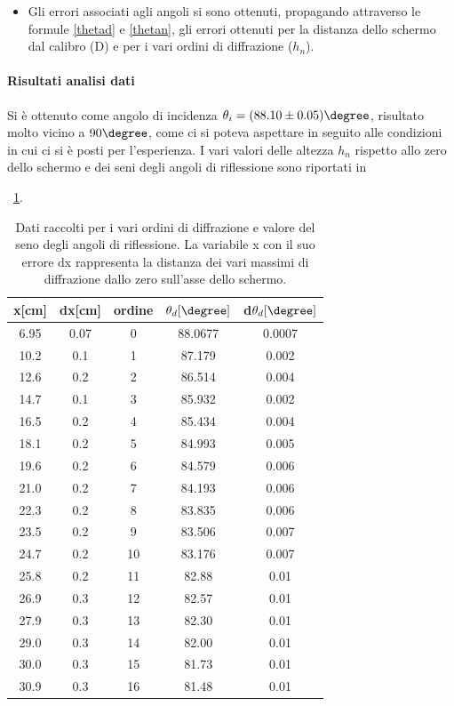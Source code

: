 \documentclass[a4paper,10pt]{article}
\begin{document}
{{\begin{itemize}
\item Gli errori associati agli angoli si sono ottenuti, propagando attraverso le formule \eqref{thetad} e \eqref{thetan}, gli errori ottenuti per    la distanza dello schermo dal calibro (D) e per i vari ordini di diffrazione ($h_n$).
\end{itemize}

\paragraph{Risultati analisi dati}
Si è ottenuto come angolo di incidenza $\theta_i = (88.10 \pm 0.05)\degree$, risultato molto vicino a $90\degree$, come ci si poteva aspettare in seguito alle condizioni in cui ci si è posti per l'esperienza. I vari valori delle altezza $h_n$ rispetto allo zero dello schermo e dei seni degli angoli di riflessione sono riportati in \tablename{~\ref{tab:data}.

\begin{table}[H]
	\centering
	\begin{tabular}{c|c|c|c|c}
x[cm] & dx[cm] & ordine & $\theta_d[\degree]$ & d$\theta_d[\degree]$ \\
\hline
6.95 & 0.07 & 0 & 88.0677 & 0.0007 \\
10.2 & 0.1 & 1 & 87.179 & 0.002 \\
12.6 & 0.2 & 2 & 86.514 & 0.004 \\
14.7 & 0.1 & 3 & 85.932 & 0.002 \\
16.5 & 0.2 & 4 & 85.434 & 0.004 \\
18.1 & 0.2 & 5 & 84.993 & 0.005 \\
19.6 & 0.2 & 6 & 84.579 & 0.006 \\
21.0 & 0.2 & 7 & 84.193 & 0.006 \\
22.3 & 0.2 & 8 & 83.835 & 0.006 \\
23.5 & 0.2 & 9 & 83.506 & 0.007 \\
24.7 & 0.2 & 10 & 83.176 & 0.007 \\
25.8 & 0.2 & 11 & 82.88 & 0.01 \\
26.9 & 0.3 & 12 & 82.57 & 0.01 \\
27.9 & 0.3 & 13 & 82.30 & 0.01 \\
29.0 & 0.3 & 14 & 82.00 & 0.01 \\
30.0 & 0.3 & 15 & 81.73 & 0.01 \\
30.9 & 0.3 & 16 & 81.48 & 0.01 \\
	\end{tabular}
\caption{Dati raccolti per i vari ordini di diffrazione e valore del seno degli angoli di riflessione. La variabile x con il suo errore dx rappresenta la distanza dei vari massimi di diffrazione dallo zero sull'asse dello schermo.}
\label{tab:data}
\end{table}



}}}
\end{document}
